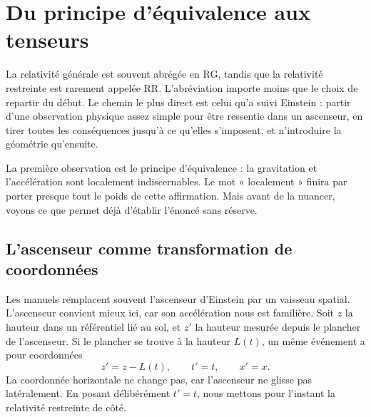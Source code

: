 \chapter{Du principe d’équivalence aux tenseurs}

La relativité générale est souvent abrégée en RG, tandis que la relativité restreinte est rarement appelée RR. L’abréviation importe moins que le choix de repartir du début. Le chemin le plus direct est celui qu’a suivi Einstein : partir d’une observation physique assez simple pour être ressentie dans un ascenseur, en tirer toutes les conséquences jusqu’à ce qu’elles s’imposent, et n’introduire la géométrie qu’ensuite.

La première observation est le principe d’équivalence : la gravitation et l’accélération sont localement indiscernables. Le mot « localement » finira par porter presque tout le poids de cette affirmation. Mais avant de la nuancer, voyons ce que permet déjà d’établir l’énoncé sans réserve.

\section{L’ascenseur comme transformation de coordonnées}

Les manuels remplacent souvent l’ascenseur d’Einstein par un vaisseau spatial. L’ascenseur convient mieux ici, car son accélération nous est familière. Soit \(z\) la hauteur dans un référentiel lié au sol, et \(z'\) la hauteur mesurée depuis le plancher de l’ascenseur. Si le plancher se trouve à la hauteur \(L(t)\), un même événement a pour coordonnées
\begin{equation}
 z'=z-L(t),\qquad t'=t,\qquad x'=x.
\label{eq:elevator-map}
\end{equation}
La coordonnée horizontale ne change pas, car l’ascenseur ne glisse pas latéralement. En posant délibérément \(t'=t\), nous mettons pour l’instant la relativité restreinte de côté.

\begin{classroomqa}
\end{classroomqa}

